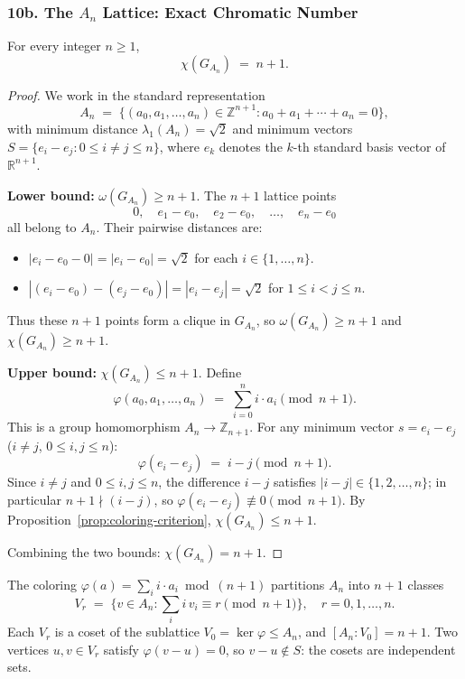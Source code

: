 \subsubsection*{10b. The $A_n$ Lattice: Exact Chromatic Number}

\begin{theorem}\label{thm:An-coloring}
For every integer $n \ge 1$,
\[
  \chi(G_{A_n}) \;=\; n + 1.
\]
\end{theorem}

\begin{proof}
We work in the standard representation
\[
  A_n \;=\; \bigl\{(a_0, a_1, \ldots, a_n) \in \mathbb{Z}^{n+1} : a_0 + a_1 + \cdots + a_n = 0\bigr\},
\]
with minimum distance $\lambda_1(A_n) = \sqrt{2}$ and minimum vectors $S = \{e_i - e_j : 0 \le i \neq j \le n\}$, where $e_k$ denotes the $k$-th standard basis vector of $\mathbb{R}^{n+1}$.

\textbf{Lower bound:} $\omega(G_{A_n}) \ge n+1$.  The $n+1$ lattice points
\[
  0,\quad e_1 - e_0,\quad e_2 - e_0,\quad \ldots,\quad e_n - e_0
\]
all belong to $A_n$.  Their pairwise distances are:
\begin{itemize}
  \item $|e_i - e_0 - 0| = |e_i - e_0| = \sqrt{2}$ for each $i \in \{1, \ldots, n\}$.
  \item $|(e_i - e_0) - (e_j - e_0)| = |e_i - e_j| = \sqrt{2}$ for $1 \le i < j \le n$.
\end{itemize}
Thus these $n+1$ points form a clique in $G_{A_n}$, so $\omega(G_{A_n}) \ge n+1$ and $\chi(G_{A_n}) \ge n+1$.

\textbf{Upper bound:} $\chi(G_{A_n}) \le n+1$.  Define
\[
  \varphi(a_0, a_1, \ldots, a_n) \;=\; \sum_{i=0}^n i \cdot a_i \pmod{n+1}.
\]
This is a group homomorphism $A_n \to \mathbb{Z}_{n+1}$.  For any minimum vector $s = e_i - e_j$ ($i \neq j$, $0 \le i, j \le n$):
\[
  \varphi(e_i - e_j) \;=\; i - j \pmod{n+1}.
\]
Since $i \neq j$ and $0 \le i, j \le n$, the difference $i - j$ satisfies $|i-j| \in \{1, 2, \ldots, n\}$; in particular $n+1 \nmid (i-j)$, so $\varphi(e_i - e_j) \not\equiv 0 \pmod{n+1}$.  By Proposition~\ref{prop:coloring-criterion}, $\chi(G_{A_n}) \le n+1$.

Combining the two bounds: $\chi(G_{A_n}) = n+1$.
\end{proof}

\begin{remark}
The coloring $\varphi(a) = \sum_i i \cdot a_i \bmod (n+1)$ partitions $A_n$ into $n+1$ classes
\[
  V_r \;=\; \bigl\{v \in A_n : \textstyle\sum_i i\,v_i \equiv r \pmod{n+1}\bigr\}, \quad r = 0, 1, \ldots, n.
\]
Each $V_r$ is a coset of the sublattice $V_0 = \ker\varphi \le A_n$, and $[A_n : V_0] = n+1$.  Two vertices $u, v \in V_r$ satisfy $\varphi(v-u) = 0$, so $v-u \notin S$: the cosets are independent sets.
\end{remark}


